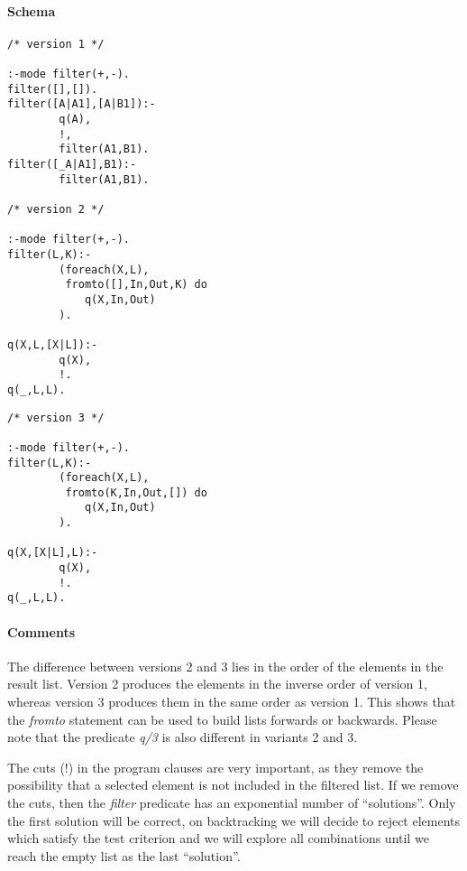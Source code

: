 \documentclass[a4paper,12pt]{report}
\begin{document}
\paragraph{Schema}
\begin{verbatim}
/* version 1 */

:-mode filter(+,-).
filter([],[]).
filter([A|A1],[A|B1]):-
        q(A),
        !,
        filter(A1,B1).
filter([_A|A1],B1):-
        filter(A1,B1).

/* version 2 */

:-mode filter(+,-).
filter(L,K):-
        (foreach(X,L),
         fromto([],In,Out,K) do
            q(X,In,Out)
        ).

q(X,L,[X|L]):-
        q(X),
        !.
q(_,L,L).
\end{verbatim}
\pagebreak
\begin{verbatim}
/* version 3 */

:-mode filter(+,-).
filter(L,K):-
        (foreach(X,L),
         fromto(K,In,Out,[]) do
            q(X,In,Out)
        ).

q(X,[X|L],L):-
        q(X),
        !.
q(_,L,L).
\end{verbatim}
\paragraph{Comments}
The difference between versions 2 and 3 lies in the order of the elements in the result list. Version 2 produces the elements in the inverse order of version 1, whereas version 3 produces them in the same order as version 1. This shows that the {\it fromto} statement can be used to build lists forwards or backwards. Please note that the predicate {\it q/3} is also different in variants 2 and 3.

The cuts (!) in the program clauses are very important, as they remove the possibility that a selected element is not included in the filtered list. If we remove the cuts, then the {\it filter} predicate has an exponential number of ``solutions''. Only the first solution will be correct, on backtracking we will decide to reject elements which satisfy the test criterion and we will explore all combinations until we reach the empty list as the last ``solution''.
\pagebreak
\end{document}
